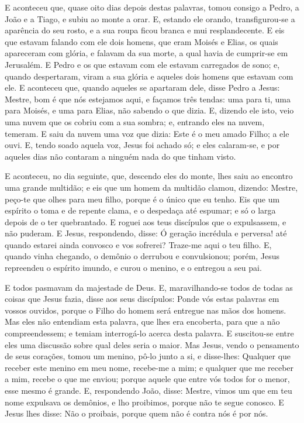E aconteceu que, quase oito dias depois destas palavras, tomou
consigo a Pedro, a João e a Tiago, e subiu ao monte a orar.
E, estando ele orando, transfigurou-se a aparência do seu
rosto, e a sua roupa ficou branca e mui resplandecente. E eis
que estavam falando com ele dois homens, que eram Moisés e Elias,
os quais apareceram com glória, e falavam da sua morte, a
qual havia de cumprir-se em Jerusalém. E Pedro e os que
estavam com ele estavam carregados de sono; e, quando despertaram,
viram a sua glória e aqueles dois homens que estavam com ele.
E aconteceu que, quando aqueles se apartaram dele, disse
Pedro a Jesus: Mestre, bom é que nós estejamos aqui, e façamos três
tendas: uma para ti, uma para Moisés, e uma para Elias, não sabendo
o que dizia. E, dizendo ele isto, veio uma nuvem que os
cobriu com a sua sombra; e, entrando eles na nuvem, temeram.
E saiu da nuvem uma voz que dizia: Este é o meu amado Filho;
a ele ouvi. E, tendo soado aquela voz, Jesus foi achado só; e
eles calaram-se, e por aqueles dias não contaram a ninguém nada do
que tinham visto.

E aconteceu, no dia seguinte, que, descendo eles do monte, lhes
saiu ao encontro uma grande multidão; e eis que um homem da
multidão clamou, dizendo: Mestre, peço-te que olhes para meu filho,
porque é o único que eu tenho. Eis que um espírito o toma e
de repente clama, e o despedaça até espumar; e só o larga depois de
o ter quebrantado. E roguei aos teus discípulos que o
expulsassem, e não puderam. E Jesus, respondendo, disse: Ó
geração incrédula e perversa! até quando estarei ainda convosco e
vos sofrerei? Traze-me aqui o teu filho. E, quando vinha
chegando, o demônio o derrubou e convulsionou; porém, Jesus
repreendeu o espírito imundo, e curou o menino, e o entregou a seu
pai.

E todos pasmavam da majestade de Deus. E, maravilhando-se todos
de todas as coisas que Jesus fazia, disse aos seus discípulos:
Ponde vós estas palavras em vossos ouvidos, porque o Filho do
homem será entregue nas mãos dos homens. Mas eles não
entendiam esta palavra, que lhes era encoberta, para que a não
compreendessem; e temiam interrogá-lo acerca desta palavra. E
suscitou-se entre eles uma discussão sobre qual deles seria o maior.
Mas Jesus, vendo o pensamento de seus corações, tomou um
menino, pô-lo junto a si, e disse-lhes: Qualquer que receber
este menino em meu nome, recebe-me a mim; e qualquer que me receber
a mim, recebe o que me enviou; porque aquele que entre vós todos for
o menor, esse mesmo é grande. E, respondendo João, disse:
Mestre, vimos um que em teu nome expulsava os demônios, e lho
proibimos, porque não te segue conosco. E Jesus lhes disse:
Não o proibais, porque quem não é contra nós é por nós.

